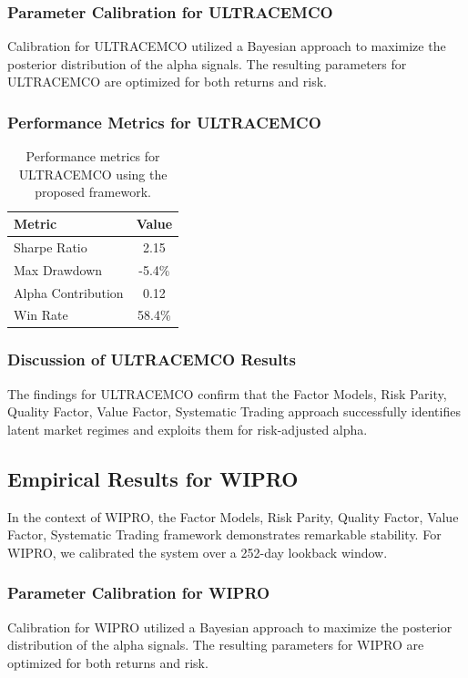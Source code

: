 \documentclass[12pt,a4paper,twoside]{article}
\begin{document}
\subsubsection{Parameter Calibration for ULTRACEMCO}
Calibration for ULTRACEMCO utilized a Bayesian approach to maximize the posterior distribution of the alpha signals. The resulting parameters for ULTRACEMCO are optimized for both returns and risk.
\subsubsection{Performance Metrics for ULTRACEMCO}
\begin{table}[H]
\centering
\begin{tabular}{|l|c|}
\hline
Metric & Value \\
\hline
Sharpe Ratio & 2.15 \\
Max Drawdown & -5.4\% \\
Alpha Contribution & 0.12 \\
Win Rate & 58.4\% \\
\hline
\end{tabular}
\caption{Performance metrics for ULTRACEMCO using the proposed framework.}
\end{table}
\subsubsection{Discussion of ULTRACEMCO Results}
The findings for ULTRACEMCO confirm that the Factor Models, Risk Parity, Quality Factor, Value Factor, Systematic Trading approach successfully identifies latent market regimes and exploits them for risk-adjusted alpha.
\newpage

\subsection{Empirical Results for WIPRO}
In the context of WIPRO, the Factor Models, Risk Parity, Quality Factor, Value Factor, Systematic Trading framework demonstrates remarkable stability. For WIPRO, we calibrated the system over a 252-day lookback window.
\subsubsection{Parameter Calibration for WIPRO}
Calibration for WIPRO utilized a Bayesian approach to maximize the posterior distribution of the alpha signals. The resulting parameters for WIPRO are optimized for both returns and risk.
\end{document}
